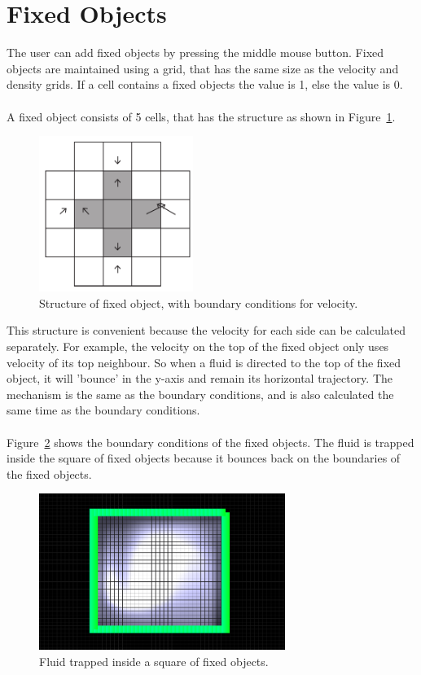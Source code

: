 \section{Fixed Objects}
The user can add fixed objects by pressing the middle mouse button.
Fixed objects are maintained using a grid, that has the same size as the velocity and density grids.
If a cell contains a fixed objects the value is 1, else the value is 0.\\
\\
A fixed object consists of 5 cells, that has the structure as shown in Figure~\ref{fig:fixedstructure}.

\begin{figure}[h]
    \centering
    \includegraphics[width=5cm]{img/fixedstructure.pdf}
    \caption{Structure of fixed object, with boundary conditions for velocity.}
    \label{fig:fixedstructure}
\end{figure}

\noindent This structure is convenient because the velocity for each side can be calculated separately.
For example, the velocity on the top of the fixed object only uses velocity of its top neighbour.
So when a fluid is directed to the top of the fixed object, it will 'bounce' in the y-axis and remain its horizontal trajectory.
The mechanism is the same as the boundary conditions, and is also calculated the same time as the boundary conditions.\\
\\
Figure~\ref{fig:fixed} shows the boundary conditions of the fixed objects. The fluid is trapped inside the square of fixed objects because it bounces back on the boundaries of the fixed objects.

\begin{figure}
    \centering
    \includegraphics[width=8cm]{img/fixed.png}
    \caption{Fluid trapped inside a square of fixed objects.}
    \label{fig:fixed}
\end{figure}
